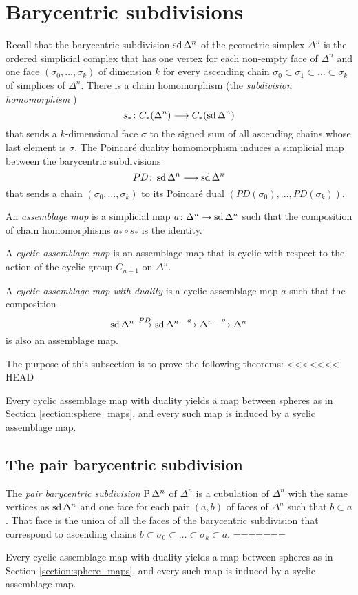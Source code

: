 \section{Barycentric subdivisions} Recall that the barycentric subdivision $\operatorname{sd} \Delta^n$ of the geometric simplex $\Delta^n$ is the ordered simplicial complex that has one vertex for each non-empty face of $\Delta^n$ and one face $(\sigma_0,\ldots,\sigma_k)$ of dimension $k$ for every ascending chain $\sigma_0\subset \sigma_1\subset\ldots \subset \sigma_k$ of simplices of $\Delta^n$. There is a chain homomorphism (the \emph{subdivision homomorphism} \cite[\P 1.12]{NR})
\[
    s_*\colon C_*(\Delta^n)\longrightarrow C_*(\operatorname{sd} \Delta^n)
\]
that sends a $k$-dimensional face $\sigma$ to the signed sum of all ascending chains whose last element is $\sigma$. The Poincaré duality homomorphism induces a simplicial map between the barycentric subdivisions
\[PD\colon \operatorname{sd} \Delta^n\longrightarrow \operatorname{sd} \Delta^n\]
that sends a chain $(\sigma_0,\ldots,\sigma_k)$ to its Poincaré dual $(PD(\sigma_0),\ldots,PD(\sigma_k))$.
\begin{definition}
    An \emph{assemblage map} is a simplicial map $a\colon \Delta^n\to \operatorname{sd} \Delta^n$ such that the composition of chain homomorphisms $a_*\circ s_*$ is the identity.
\end{definition}
\begin{definition}
    A \emph{cyclic assemblage map} is an assemblage map that is cyclic with respect to the action of the cyclic group $C_{n+1}$ on $\Delta^n$.
\end{definition}
\begin{definition}
    A \emph{cyclic assemblage map with duality} is a cyclic assemblage map $a$ such that the composition
    \[\operatorname{sd} \Delta^n \overset{PD}{\longrightarrow} \operatorname{sd} \Delta^n \overset{a}{\longrightarrow} \Delta^n\overset{\rho}{\longrightarrow} \Delta^n \]
    is also an assemblage map.
\end{definition}
The purpose of this subsection is to prove the following theorems:
<<<<<<< HEAD
\begin{theorem}
    Every cyclic assemblage map with duality yields a map between spheres as in Section \ref{section:sphere_maps}, and every such map is induced by a syclic assemblage map.
\end{theorem}

\subsection{The pair barycentric subdivision} The \emph{pair barycentric subdivision} $\operatorname{P} \Delta^n$ of $\Delta^n$ is a cubulation of $\Delta^n$ with the same vertices as $\operatorname{sd} \Delta^n$ and one face for each pair $(a,b)$ of faces of $\Delta^n$ such that $b\subset a$. That face is the union of all the faces of the barycentric subdivision that correspond to ascending chains $b\subset \sigma_0\subset \ldots\subset \sigma_k\subset a$.
=======
\begin{theorem} 
    Every cyclic assemblage map with duality yields a map between spheres as in Section \ref{section:sphere_maps}, and every such map is induced by a syclic assemblage map.
\end{theorem}


